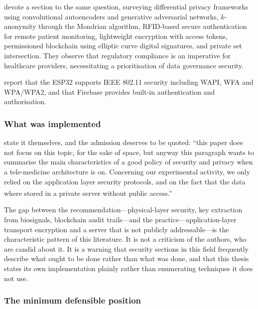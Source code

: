 \documentclass[12pt,a4paper,oneside]{report}
\newcommand{\bq}[1]{``#1''\textsuperscript{\dag}}
\begin{document}
\Textcite{liu2025review} devote a section to the same question, surveying differential privacy frameworks using convolutional autoencoders and generative adversarial networks, $k$-anonymity through the Mondrian algorithm, RFID-based secure authentication for remote patient monitoring, lightweight encryption with access tokens, permissioned blockchain using elliptic curve digital signatures, and private set intersection. They observe that regulatory compliance is an imperative for healthcare providers, necessitating a prioritisation of data governance security.

\Textcite{efendi2025} report that the ESP32 supports IEEE 802.11 security including WAPI, WFA and WPA/WPA2, and that Firebase provides built-in authentication and authorisation.

\subsubsection{What was implemented}\label{sec:security-gap}

\Textcite{mucchi2021} state it themselves, and the admission deserves to be quoted: \bq{this paper does not focus on this topic, for the sake of space, but anyway this paragraph wants to summarise the main characteristics of a good policy of security and privacy when a tele-medicine architecture is on. Concerning our experimental activity, we only relied on the application layer security protocols, and on the fact that the data where stored in a private server without public access.}

The gap between the recommendation---physical-layer security, key extraction from biosignals, blockchain audit trails---and the practice---application-layer transport encryption and a server that is not publicly addressable---is the characteristic pattern of this literature. It is not a criticism of the authors, who are candid about it. It is a warning that security sections in this field frequently describe what ought to be done rather than what was done, and that this thesis states its own implementation plainly rather than enumerating techniques it does not use.

\subsubsection{The minimum defensible position}
\end{document}
